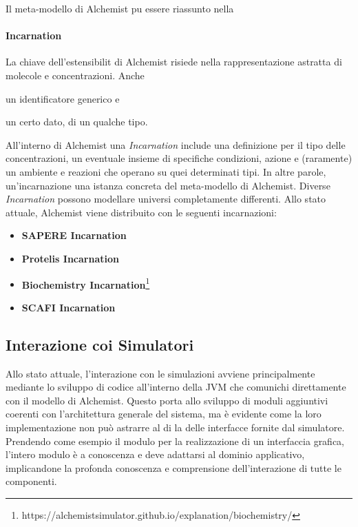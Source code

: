 Il meta-modello di Alchemist pu essere riassunto nella 


\paragraph{Incarnation} La chiave dell'estensibilit di Alchemist risiede nella rappresentazione astratta di molecole e concentrazioni. Anche
\begin{enumerate*}[label=(\roman*)]
    \item un identificatore generico e
    \item un certo dato, di un qualche tipo.
\end{enumerate*}
All'interno di Alchemist una \textit{Incarnation} include una definizione per il tipo delle concentrazioni, un eventuale insieme di specifiche
condizioni, azione e (raramente) un ambiente e reazioni che operano su quei determinati tipi. In altre parole, un'incarnazione  una
istanza concreta del meta-modello di Alchemist.
%
Diverse \textit{Incarnation} possono modellare universi completamente differenti. Allo stato attuale, Alchemist viene distribuito con le seguenti incarnazioni:
\begin{itemize}
    \item \textbf{SAPERE Incarnation}~\cite{sapere}
    \item \textbf{Protelis Incarnation}~\cite{protelis}
    \item \textbf{Biochemistry Incarnation}\footnote{https://alchemistsimulator.github.io/explanation/biochemistry/}
    \item \textbf{SCAFI Incarnation}~\cite{CASADEI2022101248}
\end{itemize}

\subsection{Interazione coi Simulatori}\label{ssec:sim-interactions}
Allo stato attuale, l'interazione con le simulazioni avviene principalmente mediante lo sviluppo di codice all'interno della \ac{JVM} che comunichi direttamente con il modello di Alchemist.
Questo porta allo sviluppo di moduli aggiuntivi coerenti con l'architettura generale del sistema, ma è evidente come la loro implementazione non può astrarre al di la delle interfacce fornite
dal simulatore. Prendendo come esempio il modulo per la realizzazione di un interfaccia grafica, l'intero modulo è a conoscenza e deve adattarsi al dominio applicativo, implicandone 
la profonda conoscenza e comprensione dell'interazione di tutte le componenti.


